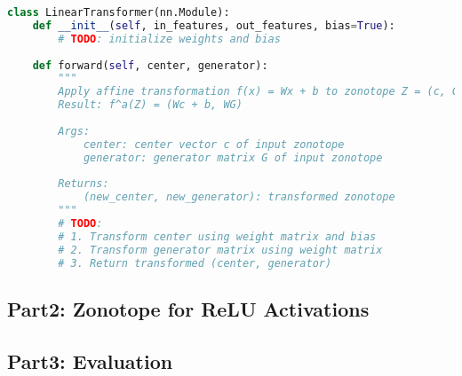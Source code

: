 \begin{lstlisting}[language=Python]
class LinearTransformer(nn.Module):
    def __init__(self, in_features, out_features, bias=True):
        # TODO: initialize weights and bias
    
    def forward(self, center, generator):
        """
        Apply affine transformation f(x) = Wx + b to zonotope Z = (c, G)
        Result: f^a(Z) = (Wc + b, WG)
        
        Args:
            center: center vector c of input zonotope
            generator: generator matrix G of input zonotope  
            
        Returns:
            (new_center, new_generator): transformed zonotope
        """
        # TODO: 
        # 1. Transform center using weight matrix and bias
        # 2. Transform generator matrix using weight matrix 
        # 3. Return transformed (center, generator)

    \end{lstlisting}


\subsection{Part2: Zonotope for ReLU Activations}

\subsection{Part3: Evaluation}